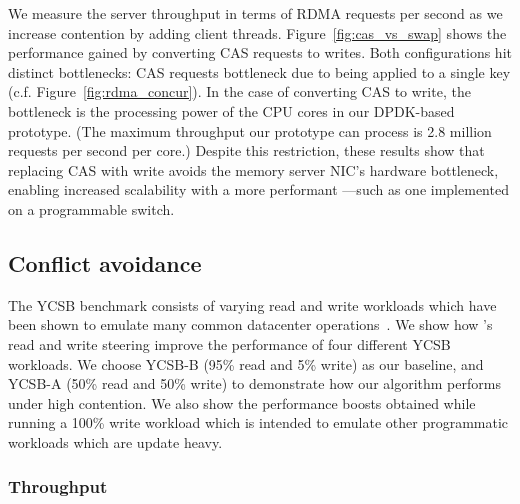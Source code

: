 We measure the server throughput in terms of RDMA requests per second as we
increase contention by adding client threads.  Figure~\ref{fig:cas_vs_swap}
shows the performance gained by converting CAS requests to writes. Both
configurations hit distinct bottlenecks: CAS requests bottleneck due to being
applied to a single key (c.f. Figure~\ref{fig:rdma_concur}). In the case of
converting CAS to write, the bottleneck is the processing power of the CPU cores
in our DPDK-based {\sword} prototype. (The maximum throughput our prototype can
process is 2.8 million requests per second per core.)
Despite this restriction, these results show that replacing CAS with write
avoids the memory server NIC's hardware bottleneck, enabling increased
scalability with a more performant {\sword}---such as one implemented on a
programmable switch. ~



\subsection{Conflict avoidance}

The YCSB benchmark consists of varying read and write workloads which
have been shown to emulate many common datacenter
operations~\cite{ycsb}. We show how \sword's read and write steering
improve the
performance of four different
YCSB workloads. We choose YCSB-B (95\% read and 5\% write) as our baseline, and
YCSB-A (50\% read and 50\% write) to demonstrate how our algorithm performs
under high contention.  We also show the performance boosts obtained while
running a 100\% write workload which is intended to emulate other programmatic
workloads which are update heavy.

\subsubsection{Throughput}

